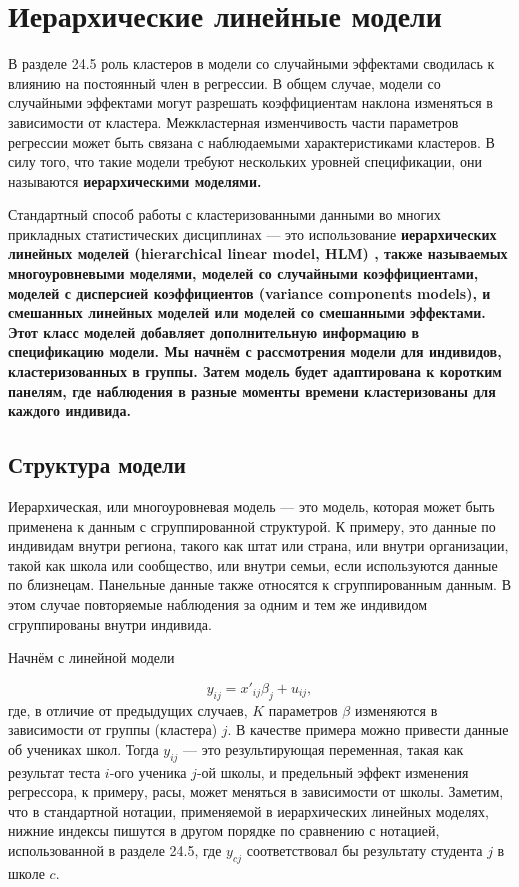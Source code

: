 \section{Иерархические линейные модели}

В разделе 24.5 роль кластеров в модели со случайными эффектами сводилась к влиянию на постоянный член в регрессии. В общем случае, модели со случайными эффектами могут разрешать коэффициентам наклона изменяться в зависимости от кластера. Межкластерная изменчивость части параметров регрессии может быть связана с наблюдаемыми характеристиками кластеров. В силу того, что такие модели требуют нескольких уровней спецификации, они называются \bfseries иерархическими моделями.\mdseries

Стандартный способ работы с кластеризованными данными во многих прикладных статистических дисциплинах --- это использование \bfseries иерархических линейных моделей (hierarchical linear model, HLM) \mdseries, также называемых \bfseries многоуровневыми моделями, \mdseries моделей со случайными коэффициентами, моделей с дисперсией коэффициентов (variance components models), и смешанных линейных моделей или \bfseries моделей со смешанными эффектами. \mdseries Этот класс моделей добавляет дополнительную информацию в спецификацию модели. Мы начнём с рассмотрения модели для индивидов, кластеризованных в группы. Затем модель будет адаптирована к коротким панелям, где наблюдения в разные моменты времени кластеризованы для каждого индивида. 

\subsection{Структура модели}

Иерархическая, или многоуровневая модель --- это модель, которая может быть применена к данным с сгруппированной структурой. К примеру, это данные по индивидам внутри региона, такого как штат или страна, или внутри организации, такой как школа или сообщество, или внутри семьи, если используются данные по близнецам. Панельные данные также относятся к сгруппированным данным. В этом случае повторяемые наблюдения за одним и тем же индивидом сгруппированы внутри индивида. 

Начнём с линейной модели

\begin{equation}
\label{eq24.49}
y_{ij} = x'_{ij} \beta_j + u_{ij}, 
\end{equation}
где, в отличие от предыдущих случаев, $K$ параметров $\beta$ изменяются в зависимости от группы (кластера) $j$. В качестве примера можно привести данные об учениках школ. Тогда $y_{ij}$ --- это результирующая переменная, такая как результат теста $i$-ого ученика $j$-ой школы, и предельный эффект изменения регрессора, к примеру, расы, может меняться в зависимости от школы. Заметим, что в стандартной нотации, применяемой в иерархических линейных моделях, нижние индексы пишутся в другом порядке по сравнению с нотацией, использованной в разделе 24.5, где $y_{cj}$ соответствовал бы результату студента $j$ в школе $c$. 

